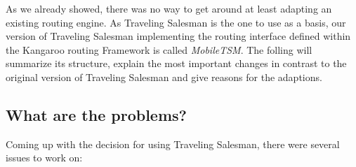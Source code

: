 As we already showed, there was no way to get around at least adapting an existing routing engine. As Traveling Salesman is the one to use as a basis, our version of Traveling Salesman implementing the routing interface defined within the Kangaroo routing Framework is called \emph{MobileTSM}. The folling will summarize its structure, explain the most important changes in contrast to the original version of Traveling Salesman and give reasons for the adaptions.

\subsection{What are the problems?}

Coming up with the decision for using Traveling Salesman, there were several issues to work on:

